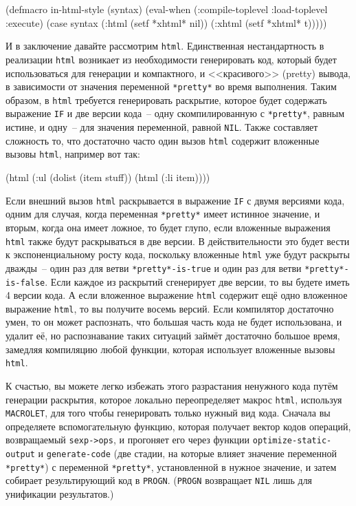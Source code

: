 \begin{myverb}
(defmacro in-html-style (syntax)
  (eval-when (:compile-toplevel :load-toplevel :execute)
    (case syntax
      (:html (setf *xhtml* nil))
      (:xhtml (setf *xhtml* t)))))
\end{myverb}

И в заключение давайте рассмотрим \lstinline{html}.  Единственная нестандартность в реализации
\lstinline{html} возникает из необходимости генерировать код, который будет использоваться для
генерации и компактного, и <<красивого>> (pretty) вывода, в зависимости от значения
переменной \lstinline{*pretty*} во время выполнения.  Таким образом, в \lstinline{html} требуется
генерировать раскрытие, которое будет содержать выражение \lstinline{IF} и две версии кода~--
одну скомпилированную с \lstinline{*pretty*}, равным истине, и одну~-- для значения переменной,
равной \lstinline{NIL}.  Также составляет сложность то, что достаточно часто один вызов
\lstinline{html} содержит вложенные вызовы \lstinline{html}, например вот так:

\begin{myverb}
(html (:ul (dolist (item stuff)) (html (:li item))))
\end{myverb}

Если внешний вызов \lstinline{html} раскрывается в выражение \lstinline{IF} с двумя версиями кода,
одним для случая, когда переменная \lstinline{*pretty*} имеет истинное значение, и вторым,
когда она имеет ложное, то будет глупо, если вложенные выражения \lstinline{html} также будут
раскрываться в две версии.  В действительности это будет вести к экспоненциальному росту
кода, поскольку вложенные \lstinline{html} уже будут раскрыты дважды~-- один раз для ветви
\lstinline{*pretty*-is-true} и один раз для ветви \lstinline{*pretty*-is-false}.  Если каждое из
раскрытий сгенерирует две версии, то вы будете иметь 4 версии кода.  А если вложенное
выражение \lstinline{html} содержит ещё одно вложенное выражение \lstinline{html}, то вы получите
восемь версий.  Если компилятор достаточно умен, то он может распознать, что большая часть
кода не будет использована, и удалит её, но распознавание таких ситуаций займёт достаточно
большое время, замедляя компиляцию любой функции, которая использует вложенные вызовы
\lstinline{html}.

К счастью, вы можете легко избежать этого разрастания ненужного кода путём генерации
раскрытия, которое локально переопределяет макрос \lstinline{html}, используя \lstinline{MACROLET},
для того чтобы генерировать только нужный вид кода.  Сначала вы определяете
вспомогательную функцию, которая получает вектор кодов операций, возвращаемый
\lstinline{sexp->ops}, и прогоняет его через функции \lstinline{optimize-static-output} и
\lstinline{generate-code} (две стадии, на которые влияет значение переменной \lstinline{*pretty*}) с
переменной \lstinline{*pretty*}, установленной в нужное значение, и затем собирает
результирующий код в \lstinline{PROGN}. (\lstinline{PROGN} возвращает \lstinline{NIL} лишь для унификации
результатов.)

